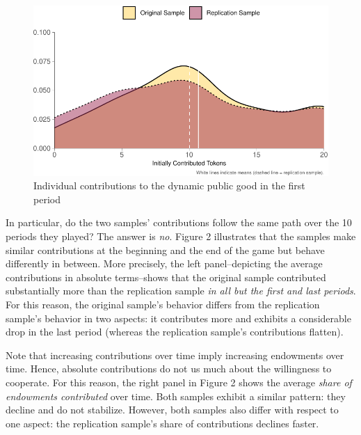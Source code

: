 \documentclass[
  authoryear,
  preprint,
  3p]{elsarticle}
\begin{document}
\begin{figure}

{\centering \includegraphics{paper_files/figure-pdf/firstRoundViz-1.pdf}

}

\caption{Individual contributions to the dynamic public good in the
first period}

\end{figure}

In particular, do the two samples' contributions follow the same path
over the 10 periods they played? The answer is \emph{no}. Figure 2
illustrates that the samples make similar contributions at the beginning
and the end of the game but behave differently in between. More
precisely, the left panel--depicting the average contributions in
absolute terms--shows that the original sample contributed substantially
more than the replication sample \emph{in all but the first and last
periods}. For this reason, the original sample's behavior differs from
the replication sample's behavior in two aspects: it contributes more
and exhibits a considerable drop in the last period (whereas the
replication sample's contributions flatten).

Note that increasing contributions over time imply increasing endowments
over time. Hence, absolute contributions do not us much about the
willingness to cooperate. For this reason, the right panel in Figure 2
shows the average \emph{share of endowments contributed} over time. Both
samples exhibit a similar pattern: they decline and do not stabilize.
However, both samples also differ with respect to one aspect: the
replication sample's share of contributions declines faster.
\end{document}
